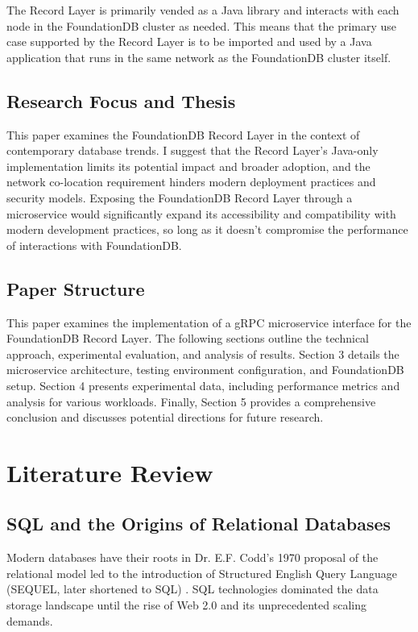 \documentclass[sigconf]{acmart}
\begin{document}
The Record Layer is primarily vended as a Java library and interacts with each node in the FoundationDB cluster as needed. This means that the primary use case supported by the Record Layer is to be imported and used by a Java application that runs in the same network as the FoundationDB cluster itself.

\subsection{Research Focus and Thesis}
This paper examines the FoundationDB Record Layer in the context of contemporary database trends. I suggest that the Record Layer's Java-only implementation limits its potential impact and broader adoption, and the network co-location requirement hinders modern deployment practices and security models. Exposing the FoundationDB Record Layer through a microservice would significantly expand its accessibility and compatibility with modern development practices, so long as it doesn't compromise the performance of interactions with FoundationDB.

\subsection{Paper Structure}
This paper examines the implementation of a gRPC microservice interface for the FoundationDB Record Layer. The following sections outline the technical approach, experimental evaluation, and analysis of results. Section 3 details the microservice architecture, testing environment configuration, and FoundationDB setup. Section 4 presents experimental data, including performance metrics and analysis for various workloads.  Finally, Section 5 provides a comprehensive conclusion and discusses potential directions for future research.

\section{Literature Review}

\subsection{SQL and the Origins of Relational Databases}

Modern databases have their roots in Dr. E.F. Codd's 1970 proposal of the relational model \cite{CoddTheory}  led to the introduction of Structured English Query Language (SEQUEL, later shortened to SQL) \cite{SEQUEL}. SQL technologies dominated the data storage landscape until the rise of Web 2.0 and its unprecedented scaling demands.
\end{document}
